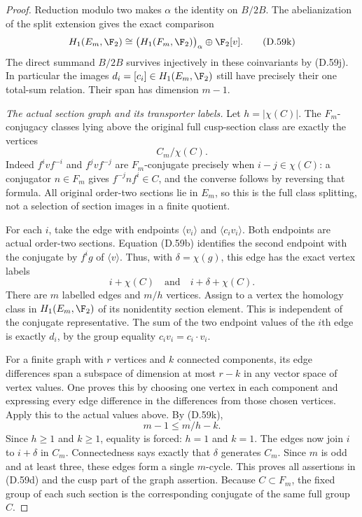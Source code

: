 \begin{proof}
Reduction modulo two makes $\alpha$ the identity
on $B/2B$. The abelianization of the split extension
gives the exact comparison
\[
 H_1(E_m,\F_2)
   \cong \bigl(H_1(F_m,\F_2)\bigr)_{\alpha}
                    \oplus\F_2[v].
                                                        \tag{D.59k}
\]
The direct summand $B/2B$ survives injectively
in these coinvariants by (D.59j).
In particular the images
$d_i=[c_i]\in H_1(E_m,\F_2)$ still have precisely
their one total-sum relation. Their span has
dimension $m-1$.

\emph{The actual section graph and its transporter labels.}
Let $h=|\chi(C)|$.
The $F_m$-conjugacy classes lying above the
original full cusp-section class are exactly
the vertices
\[
                              C_m/\chi(C).
                                                        \tag{D.59l}
\]
Indeed $f^ivf^{-i}$ and $f^jvf^{-j}$ are
$F_m$-conjugate precisely when $i-j\in\chi(C)$:
a conjugator $n\in F_m$ gives
$f^{-j}nf^i\in C$, and the converse follows by
reversing that formula.
All original order-two sections lie in $E_m$,
so this is the full class splitting, not a
selection of section images in a finite quotient.

For each $i$, take the edge with endpoints
$\langle v_i\rangle$ and $\langle c_i v_i\rangle$.
Both endpoints are actual order-two sections.
Equation (D.59b) identifies the second endpoint
with the conjugate by $f^ig$ of $\langle v\rangle$.
Thus, with $\delta=\chi(g)$, this edge has the
exact vertex labels
\[
              i+\chi(C)\quad\text{and}\quad
                         i+\delta+\chi(C).
                                                        \tag{D.59m}
\]
There are $m$ labelled edges and $m/h$ vertices.
Assign to a vertex the homology class in
$H_1(E_m,\F_2)$ of its nonidentity section element.
This is independent of the conjugate representative.
The sum of the two endpoint values of the $i$th
edge is exactly $d_i$, by the group equality
$c_i v_i=c_i\cdot v_i$.

For a finite graph with $r$ vertices and $k$
connected components, its edge differences span
a subspace of dimension at most $r-k$ in any
vector space of vertex values.
One proves this by choosing one vertex in each
component and expressing every edge difference
in the differences from those chosen vertices.
Apply this to the actual values above. By (D.59k),
\[
                         m-1\leq m/h-k .
                                                        \tag{D.59n}
\]
Since $h\geq1$ and $k\geq1$, equality is forced:
$h=1$ and $k=1$.
The edges now join $i$ to $i+\delta$ in $C_m$.
Connectedness says exactly that $\delta$ generates
$C_m$. Since $m$ is odd and at least three,
these edges form a single $m$-cycle.
This proves all assertions in (D.59d) and the
cusp part of the graph assertion.
Because $C\subset F_m$, the fixed group of each
such section is the corresponding conjugate of
the same full group $C$.


\end{proof}
